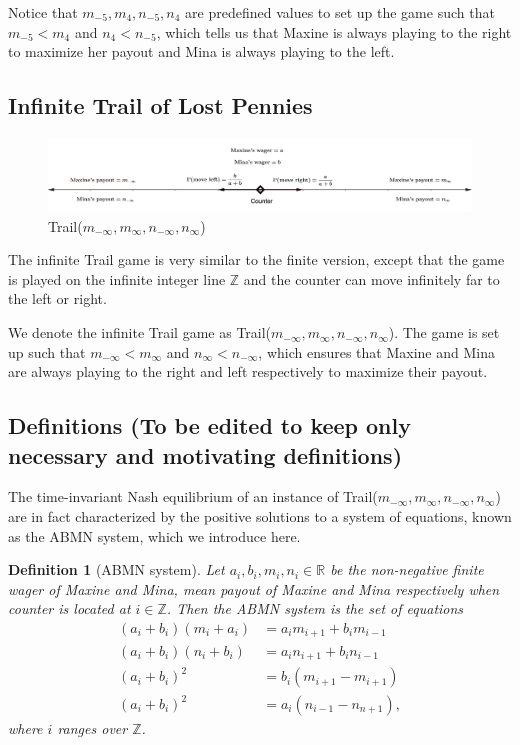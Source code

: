 \documentclass{article}
\newtheorem{definition}{Definition}
\newcommand*{\R}{\mathbb{R}}
\newcommand*{\Z}{\mathbb{Z}}
\begin{document}
Notice that $m_{-5}, m_4, n_{-5}, n_4$ are predefined values to set up the game such that
$m_{-5}<m_4$ and $n_4<n_{-5}$, which tells us that Maxine is always playing to the right to maximize
her payout and Mina is always playing to the left. 

\subsection{\centering Infinite Trail of Lost Pennies}
\begin{figure}[htb!]
    \centering
    \includegraphics[scale=0.3]{infinite_trail.png}
    \caption{Trail($m_{-\infty}, m_{\infty}, n_{-\infty}, n_{\infty}$)}
\end{figure}

The infinite Trail game is very similar to the finite version, except that the game is played on the 
infinite integer line $\Z$ and the counter can move infinitely far to the left or right.

We denote the infinite Trail game as Trail($m_{-\infty}, m_{\infty}, n_{-\infty}, n_{\infty}$). The
game is set up such that $m_{-\infty}<m_{\infty}$ and $n_{\infty}<n_{-\infty}$, which ensures that
Maxine and Mina are always playing to the right and left respectively to maximize their payout.


\subsection{\centering Definitions (To be edited to keep only necessary and motivating definitions)}
The time-invariant Nash equilibrium of an instance of Trail($m_{-\infty}, m_{\infty}, n_{-\infty},
n_{\infty}$) are in fact characterized by the positive solutions to a system of equations, known as
the ABMN system, which we introduce here.

\begin{definition}[ABMN system]
    Let $a_i, b_i, m_i, n_i \in\R$ be the non-negative finite wager of Maxine and Mina, mean payout
    of Maxine and Mina respectively when counter is located at $i\in\mathbb{Z}$. Then the ABMN
    system is the set of equations 
    \begin{align}
        (a_i + b_i)(m_i + a_i) & = a_i m_{i+1} + b_i m_{i-1} \\
        (a_i + b_i)(n_i + b_i) & = a_i n_{i+1} + b_i n_{i-1} \\
        (a_i + b_i)^2 & = b_i (m_{i+1} - m_{i+1}) \\
        (a_i + b_i)^2 & = a_i (n_{i-1} - n_{n+1}),
    \end{align}
    where $i$ ranges over $\mathbb{Z}$. 
\end{definition}
\end{document}
